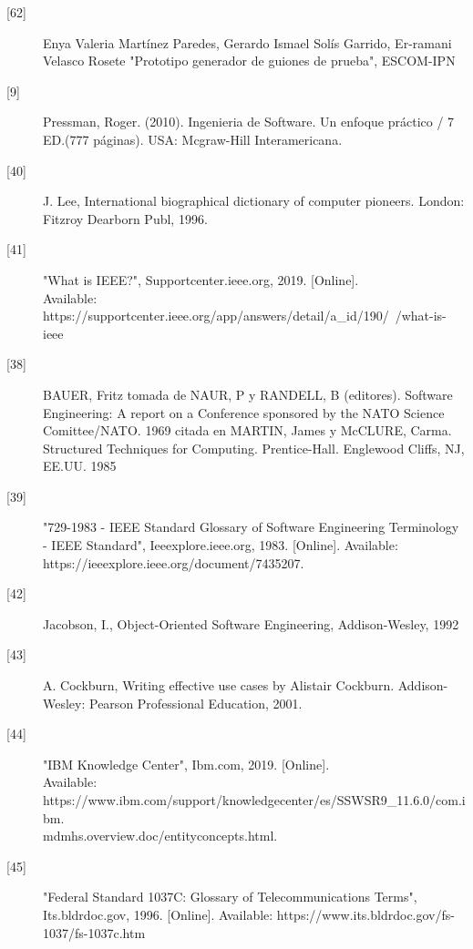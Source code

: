 \begin{description}
 		\item[\hypertarget{b62}{[62]}] Enya Valeria Martínez Paredes, Gerardo Ismael Solís Garrido, Er-ramani Velasco Rosete "Prototipo generador de guiones de prueba", ESCOM-IPN
 	
		\item[\hypertarget{b09}{[9]}] Pressman, Roger. (2010). Ingenieria de Software. Un enfoque práctico / 7 ED.(777 páginas). USA: Mcgraw-Hill Interamericana.
		
		\item[\hypertarget{b40}{[40]}] J. Lee, International biographical dictionary of computer pioneers. London: Fitzroy Dearborn Publ, 1996.
		
		\item[\hypertarget{b41}{[41]}] "What is IEEE?", Supportcenter.ieee.org, 2019. [Online].\\
		Available: https://supportcenter.ieee.org/app/answers/detail/a\_id/190/~/what-is-ieee
		
		\item[\hypertarget{b38}{[38]}] BAUER, Fritz tomada de NAUR, P y RANDELL, B (editores). Software Engineering: A report on a Conference sponsored by the NATO Science Comittee/NATO. 1969 citada en MARTIN, James y McCLURE, Carma. Structured
		Techniques for Computing. Prentice-Hall. Englewood Cliffs, NJ, EE.UU. 1985 
		
		\item[\hypertarget{b39}{[39]}] "729-1983 - IEEE Standard Glossary of Software Engineering Terminology - IEEE Standard", Ieeexplore.ieee.org, 1983. [Online]. Available: https://ieeexplore.ieee.org/document/7435207. 
		
		\item[\hypertarget{b42}{[42]}] Jacobson, I., Object-Oriented Software Engineering, Addison-Wesley, 1992
		
		\item[\hypertarget{b43}{[43]}] A. Cockburn, Writing effective use cases by Alistair Cockburn. Addison-Wesley: Pearson Professional Education, 2001.
		
		\item[\hypertarget{b44}{[44]}] "IBM Knowledge Center", Ibm.com, 2019. [Online].\\ Available: https://www.ibm.com/support/knowledgecenter/es/SSWSR9\_11.6.0/com.ibm.\\mdmhs.overview.doc/entityconcepts.html.
		
		\item[\hypertarget{b45}{[45]}] "Federal Standard 1037C: Glossary of Telecommunications Terms", Its.bldrdoc.gov, 1996. [Online]. Available: https://www.its.bldrdoc.gov/fs-1037/fs-1037c.htm
		

\end{description}
